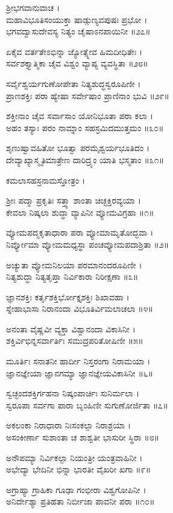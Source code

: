 ಶ್ರೀಭಗವಾನುವಾಚ ।\\
ಮಹಾವಿಭೂತಿಸಂಯುಕ್ತಾ ಷಾಡ್ಗುಣ್ಯವಪುಷಃ ಪ್ರಭೋ ।\\
ಭಗವದ್ವಾಸುದೇವಸ್ಯ ನಿತ್ಯಂ ಚೈಷಾಽನಪಾಯಿನೀ ॥೨೭॥

ಏಕೈವ ವರ್ತತೇಽಭಿನ್ನಾ ಜ್ಯೋತ್ಸ್ನೇವ ಹಿಮದೀಧಿತೇಃ ।\\
ಸರ್ವಶಕ್ತ್ಯಾತ್ಮಿಕಾ ಚೈವ ವಿಶ್ವಂ ವ್ಯಾಪ್ಯ ವ್ಯವಸ್ಥಿತಾ ॥೨೮॥

ಸರ್ವೈಶ್ವರ್ಯಗುಣೋಪೇತಾ ನಿತ್ಯಶುದ್ಧಸ್ವರೂಪಿಣೀ ।\\
ಪ್ರಾಣಶಕ್ತಿಃ ಪರಾ ಹ್ಯೇಷಾ ಸರ್ವೇಷಾಂ ಪ್ರಾಣಿನಾಂ ಭುವಿ ॥೨೯॥

ಶಕ್ತೀನಾಂ ಚೈವ ಸರ್ವಾಸಾಂ ಯೋನಿಭೂತಾ ಪರಾ ಕಲಾ ।\\
ಅಹಂ ತಸ್ಯಾಃ ಪರಂ ನಾಮ್ನಾಂ ಸಹಸ್ರಮಿದಮುತ್ತಮಂ ॥೩೦॥

ಶೃಣುಷ್ವಾವಹಿತೋ ಭೂತ್ವಾ ಪರಮೈಶ್ವರ್ಯಭೂತಿದಂ ।\\
ದೇವ್ಯಾಖ್ಯಾಸ್ಮೃತಿಮಾತ್ರೇಣ ದಾರಿದ್ರ್ಯಂ ಯಾತಿ ಭಸ್ಮತಾಂ ॥೩೧॥

ಕಮಲಾಸಹಸ್ರನಾಮಸ್ತೋತ್ರಂ ।

ಶ್ರೀಃ ಪದ್ಮಾ ಪ್ರಕೃತಿಃ ಸತ್ತ್ವಾ ಶಾಂತಾ ಚಿಚ್ಛಕ್ತಿರವ್ಯಯಾ ।\\
ಕೇವಲಾ ನಿಷ್ಕಲಾ ಶುದ್ಧಾ ವ್ಯಾಪಿನೀ ವ್ಯೋಮವಿಗ್ರಹಾ ॥೧॥

ವ್ಯೋಮಪದ್ಮಕೃತಾಧಾರಾ ಪರಾ ವ್ಯೋಮಾಮೃತೋದ್ಭವಾ ।\\
ನಿರ್ವ್ಯೋಮಾ ವ್ಯೋಮಮಧ್ಯಸ್ಥಾ ಪಂಚವ್ಯೋಮಪದಾಶ್ರಿತಾ ॥೨॥

ಅಚ್ಯುತಾ ವ್ಯೋಮನಿಲಯಾ ಪರಮಾನಂದರೂಪಿಣೀ ।\\
ನಿತ್ಯಶುದ್ಧಾ ನಿತ್ಯತೃಪ್ತಾ ನಿರ್ವಿಕಾರಾ ನಿರೀಕ್ಷಣಾ ॥೩॥

ಜ್ಞಾನಶಕ್ತಿಃ ಕರ್ತೃಶಕ್ತಿರ್ಭೋಕ್ತೃಶಕ್ತಿಃ ಶಿಖಾವಹಾ ।\\
ಸ್ನೇಹಾಭಾಸಾ ನಿರಾನಂದಾ ವಿಭೂತಿರ್ವಿಮಲಾಚಲಾ ॥೪॥

ಅನಂತಾ ವೈಷ್ಣವೀ ವ್ಯಕ್ತಾ ವಿಶ್ವಾನಂದಾ ವಿಕಾಸಿನೀ ।\\
ಶಕ್ತಿರ್ವಿಭಿನ್ನಸರ್ವಾರ್ತಿಃ ಸಮುದ್ರಪರಿತೋಷಿಣೀ ॥೫॥

ಮೂರ್ತಿಃ ಸನಾತನೀ ಹಾರ್ದೀ ನಿಸ್ತರಂಗಾ ನಿರಾಮಯಾ ।\\
ಜ್ಞಾನಜ್ಞೇಯಾ ಜ್ಞಾನಗಮ್ಯಾ ಜ್ಞಾನಜ್ಞೇಯವಿಕಾಸಿನೀ ॥೬॥

ಸ್ವಚ್ಛಂದಶಕ್ತಿರ್ಗಹನಾ ನಿಷ್ಕಂಪಾರ್ಚಿಃ ಸುನಿರ್ಮಲಾ ।\\
ಸ್ವರೂಪಾ ಸರ್ವಗಾ ಪಾರಾ ಬೃಂಹಿಣೀ ಸುಗುಣೋರ್ಜಿತಾ ॥೭॥

ಅಕಲಂಕಾ ನಿರಾಧಾರಾ ನಿಃಸಂಕಲ್ಪಾ ನಿರಾಶ್ರಯಾ ।\\
ಅಸಂಕೀರ್ಣಾ ಸುಶಾಂತಾ ಚ ಶಾಶ್ವತೀ ಭಾಸುರೀ ಸ್ಥಿರಾ ॥೮॥

ಅನೌಪಮ್ಯಾ ನಿರ್ವಿಕಲ್ಪಾ ನಿಯಂತ್ರೀ ಯಂತ್ರವಾಹಿನೀ ।\\
ಅಭೇದ್ಯಾ ಭೇದಿನೀ ಭಿನ್ನಾ ಭಾರತೀ ವೈಖರೀ ಖಗಾ ॥೯॥

ಅಗ್ರಾಹ್ಯಾ ಗ್ರಾಹಿಕಾ ಗೂಢಾ ಗಂಭೀರಾ ವಿಶ್ವಗೋಪಿನೀ ।\\
ಅನಿರ್ದೇಶ್ಯಾ ಪ್ರತಿಹತಾ ನಿರ್ಬೀಜಾ ಪಾವನೀ ಪರಾ ॥೧೦॥

